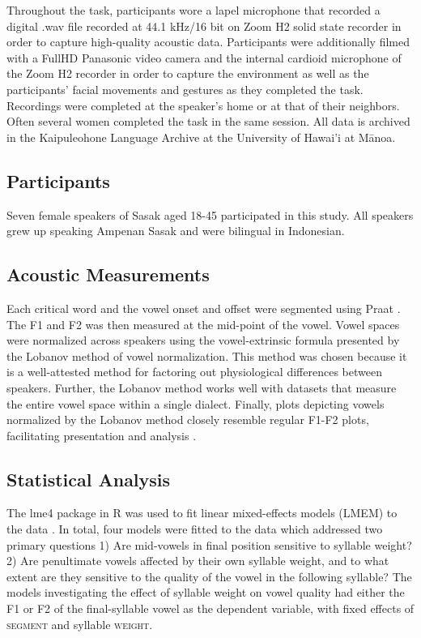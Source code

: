 \documentclass[12pt]{ouparticle}
\begin{document}
Throughout the task, participants wore a lapel microphone that recorded a digital .wav file recorded at 44.1 kHz/16 bit on Zoom H2 solid state recorder in order to capture high-quality acoustic data. Participants were additionally filmed with a FullHD Panasonic video camera and the internal cardioid microphone of the Zoom H2 recorder in order to capture the environment as well as the participants’ facial movements and gestures as they completed the task. Recordings were completed at the speaker’s home or at that of their neighbors. Often several women completed the task in the same session. All data is archived in the Kaipuleohone Language Archive at the University of Hawai'i at Mānoa.

\subsection{Participants}\label{sec:participants}

Seven female speakers of Sasak aged 18-45 participated in this study. All speakers grew up speaking Ampenan Sasak and were bilingual in Indonesian. 

\subsection{Acoustic Measurements}\label{sec:measurements}
Each critical word and the vowel onset and offset were segmented using Praat \citep{boersma2019}. The F1 and F2 was then measured at the mid-point of the vowel. Vowel spaces were normalized across speakers using the vowel-extrinsic formula presented by the Lobanov method of vowel normalization. This method was chosen because it is a well-attested method for factoring out physiological differences between speakers. Further, the Lobanov method works well with datasets that measure the entire vowel space within a single dialect. Finally, plots depicting vowels normalized by the Lobanov method closely resemble regular F1-F2 plots, facilitating presentation and analysis \citep{adank2004}.

\subsection{Statistical Analysis}\label{sec:analysis}
The lme4 package in R was used to fit linear mixed-effects models (LMEM) to the data \citep{bates2014}. In total, four models were fitted to the data which addressed two primary questions 1) Are mid-vowels in final position sensitive to syllable weight? 2) Are penultimate vowels affected by their own syllable weight, and to what extent are they sensitive to the quality of the vowel in the following syllable? The models investigating the effect of syllable weight on vowel quality had either the F1 or F2 of the final-syllable vowel as the dependent variable, with fixed effects of \textsc{segment} and syllable \textsc{weight}. 
\end{document}

